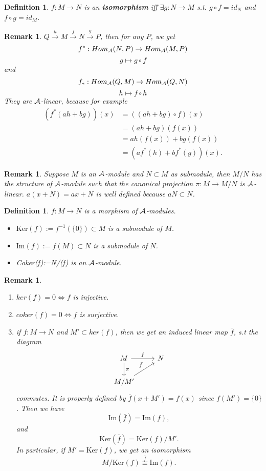 \documentclass[11pt]{article}
\newtheorem{dfn}[thm]{Definition}
\newtheorem{rmk}[thm]{Remark}
\newcommand{\cala}{{\cal A}}
\newcommand{\rta}{\rightarrow}
\newcommand{\lrta}{\longrightarrow}
\begin{document}
\begin{dfn}
$f:M\rta N$ is an \textbf{isomorphism} iff $\exists g:N\lrta M$ s.t. $g\circ f=id_N$ and $f\circ g=id_M$.
\end{dfn}
\begin{rmk}
$Q\overset{h}{\rta} M\overset{f}{\rta} N\overset{g}{\rta} P$, then for any $P$, we get
 $$
 f^*: Hom_\cala(N,P)\rta Hom_\cala(M,P)
 $$
 $$
g\mapsto g\circ f
 $$
 and 
 $$
 f_*: Hom_\cala(Q,M)\rta Hom_\cala(Q,N)
 $$
 $$
h\mapsto  f\circ h
 $$
They are $\cala$-linear, because for example
$$
\begin{aligned}
(f^*(a h+b g))(x)&=((a h+b g)\circ f) (x)\\
&= (a h+b g) (f(x))\\
&=a h(f(x))+bg(f(x))\\
&= (a f^*(h)+b f^* (g))(x).
\end{aligned}
$$
\end{rmk}

\begin{rmk}
Suppose $M$ is an $\cala$-module and $N\subset M$ as submodule, then $M/N$ has the structure of $\cala$-module such that the canonical projection $\pi: M\rta M/N$ is $\cala$-linear. $a(x+N)=ax+N$ is well defined because $a N\subset N$.
\end{rmk}
\begin{dfn}$f: M\lrta N$ is a morphism of $\cala$-modules.\\
\begin{itemize}
\item 
$
\text{Ker}(f):=f^{-1}(\{0\})\subset M
$ 
is a submodule of $M$.
\item 
$
\text{Im}(f):= f(M)\subset N
$ is a submodule of $N$.
\item 
Coker(f):=N/(f) is an $\cala$-module.
\end{itemize}
\end{dfn}
\begin{rmk}\label{rmk:iso} 
\begin{enumerate}[label=(\roman*)] 
\item $ker(f)={0}\Longleftrightarrow f$ is injective.
\item $coker(f)={0}\Longleftrightarrow f$ is surjective.
\item if $f:M\rta N$ and $M'\subset ker(f)$, then we get an induced linear map $\bar{f}$, s.t the diagram 
\[
\begin{tikzcd}
M \arrow[r,"f"] \arrow[d,"\pi"]  & N  \\
   M/M' \arrow[ur,"\bar{f}"] & 
\end{tikzcd}
\]
commutes. It is properly defined by $\bar{f}(x+M')=f(x)$ since $f(M')=\{0\}$. Then we have
$$
\text{Im}(\bar{f})=\text{Im}(f),
$$
and 
$$
\text{Ker}(\bar{f})=\text{Ker}(f)/M'.
$$
In particular, if $M'= \text{Ker}(f)$, we get an isomorphism 
$$
M/\text{Ker}(f)\overset{\bar{f}}{\cong}\text{Im}(f).
$$
\end{enumerate}
\end{rmk}
\end{document}
